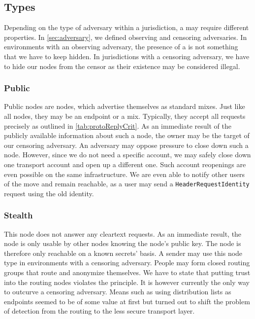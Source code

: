 \subsection{\VortexNode{} Types}\label{sec:vortexNodeTypes}
Depending on the type of adversary within a jurisdiction, a \VortexNode{} may require different properties. In \cref{sec:adversary}, we defined observing and censoring adversaries. In environments with an observing adversary, the presence of a \VortexNode{} is not something that we have to keep hidden. In jurisdictions with a censoring adversary, we have to hide our nodes from the censor as their existence may be considered illegal.

\subsubsection{Public \VortexNode}
Public nodes are nodes, which advertise themselves as standard mixes. Just like all nodes, they may be an endpoint or a mix. Typically, they accept all requests precisely as outlined in \cref{tab:protoReplyCrit}. As an immediate result of the publicly available information about such a node, the owner may be the target of our censoring adversary. An adversary may oppose pressure to close down such a node. However, since we do not need a specific account, we may safely close down one transport account and open up a different one. Such account reopenings are even possible on the same infrastructure. We are even able to notify other users of the move and remain reachable, as a user may send a \texttt{HeaderRequestIdentity} request using the old identity. 

\subsubsection{Stealth \VortexNode}\label{sec:stealthNode}
This node does not answer any cleartext requests. As an immediate result, the node is only usable by other nodes knowing the node's public key. The node is therefore only reachable on a known secrets' basis. A sender may use this node type in environments with a censoring adversary. People may form closed routing groups that route and anonymize themselves. We have to state that putting trust into the routing nodes violates the  principle. It is however currently the only way to outcurve a censoring adversary. Means such as using distribution lists as endpoints seemed to be of some value at first but turned out to shift the problem of detection from the routing to the less secure transport layer.


